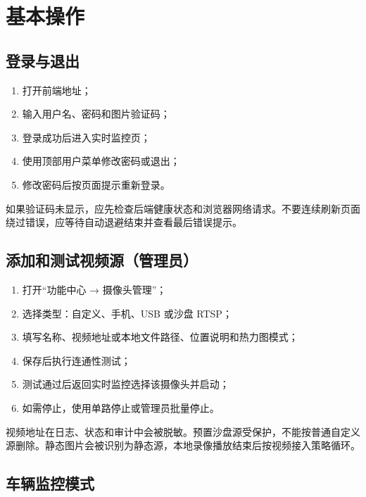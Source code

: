 \section{基本操作}\label{manual-ux57faux672cux64cdux4f5c}

\subsection{登录与退出}\label{manual-ux767bux5f55ux4e0eux9000ux51fa}

\begin{enumerate}
\def\labelenumi{\arabic{enumi}.}
\tightlist
\item
  打开前端地址；
\item
  输入用户名、密码和图片验证码；
\item
  登录成功后进入实时监控页；
\item
  使用顶部用户菜单修改密码或退出；
\item
  修改密码后按页面提示重新登录。
\end{enumerate}

如果验证码未显示，应先检查后端健康状态和浏览器网络请求。不要连续刷新页面绕过错误，应等待自动退避结束并查看最后错误提示。

\subsection{添加和测试视频源（管理员）}\label{manual-ux6dfbux52a0ux548cux6d4bux8bd5ux89c6ux9891ux6e90ux7ba1ux7406ux5458}

\begin{enumerate}
\def\labelenumi{\arabic{enumi}.}
\tightlist
\item
  打开``功能中心 → 摄像头管理''；
\item
  选择类型：自定义、手机、USB 或沙盘 RTSP；
\item
  填写名称、视频地址或本地文件路径、位置说明和热力图模式；
\item
  保存后执行连通性测试；
\item
  测试通过后返回实时监控选择该摄像头并启动；
\item
  如需停止，使用单路停止或管理员批量停止。
\end{enumerate}

视频地址在日志、状态和审计中会被脱敏。预置沙盘源受保护，不能按普通自定义源删除。静态图片会被识别为静态源，本地录像播放结束后按视频接入策略循环。

\subsection{车辆监控模式}\label{manual-ux8f66ux8f86ux76d1ux63a7ux6a21ux5f0f}

